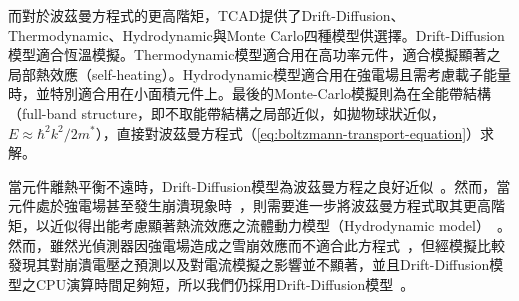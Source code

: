 而對於波茲曼方程式的更高階矩，TCAD提供了Drift-Diffusion、Thermodynamic、Hydrodynamic與Monte Carlo四種模型供選擇。Drift-Diffusion模型適合恆溫模擬。Thermodynamic模型適合用在高功率元件，適合模擬顯著之局部熱效應（self-heating）。Hydrodynamic模型適合用在強電場且需考慮載子能量時，並特別適合用在小面積元件上。最後的Monte-Carlo模擬則為在全能帶結構（full-band structure，即不取能帶結構之局部近似，如拋物球狀近似，$E\approx\hbar^2k^2/2m^*$），直接對波茲曼方程式（\ref{eq:boltzmann-transport-equation}）求解。

當元件離熱平衡不遠時，Drift-Diffusion模型為波茲曼方程之良好近似~\cite{stratton1962diffusion}。然而，當元件處於強電場甚至發生崩潰現象時~\cite{sentaurus2016sdevice}\cite{stratton1962diffusion}，則需要進一步將波茲曼方程式取其更高階矩，以近似得出能考慮顯著熱流效應之流體動力模型（Hydrodynamic model）~\cite{stratton1962diffusion}。然而，雖然光偵測器因強電場造成之雪崩效應而不適合此方程式~\cite{stratton1962diffusion}，但經模擬比較發現其對崩潰電壓之預測以及對電流模擬之影響並不顯著，並且Drift-Diffusion模型之CPU演算時間足夠短，所以我們仍採用Drift-Diffusion模型~\cite{sentaurus2016sdevice}。